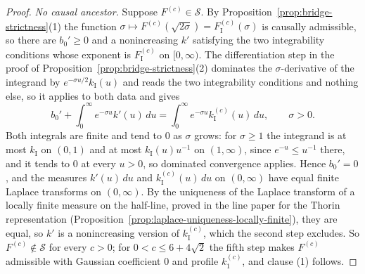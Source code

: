 \begin{proof}
\emph{No causal ancestor.} Suppose $F^{(c)} \in \mathcal{S}$. By
Proposition~\ref{prop:bridge-strictness}(1) the function
$\sigma \mapsto F^{(c)}(\sqrt{2\sigma}) = F^{(c)}_{\mathrm I}(\sigma)$ is causally admissible, so
there are $b_0' \ge 0$ and a nonincreasing $k'$ satisfying the two integrability conditions
whose exponent is $F^{(c)}_{\mathrm I}$ on $[0,\infty)$. The differentiation step in the proof of
Proposition~\ref{prop:bridge-strictness}(2) dominates the $\sigma$-derivative of the integrand
by $e^{-\sigma u/2}k_{\mathrm I}(u)$ and reads the two integrability conditions and nothing else,
so it applies to both data and gives
\[
  b_0' + \int_0^\infty e^{-\sigma u}k'(u)\,du
   = \int_0^\infty e^{-\sigma u}k^{(c)}_{\mathrm I}(u)\,du , \qquad \sigma > 0 .
\]
Both integrals are finite and tend to $0$ as $\sigma$ grows: for $\sigma \ge 1$ the integrand is
at most $k_{\mathrm I}$ on $(0,1)$ and at most $k_{\mathrm I}(u)u^{-1}$ on $(1,\infty)$, since
$e^{-u} \le u^{-1}$ there, and it tends to $0$ at every $u > 0$, so dominated convergence applies.
Hence $b_0' = 0$, and the measures $k'(u)\,du$ and $k^{(c)}_{\mathrm I}(u)\,du$ on $(0,\infty)$
have equal finite Laplace transforms on $(0,\infty)$. By the uniqueness of the Laplace transform
of a locally finite measure on the half-line, proved in the line paper for the Thorin
representation (Proposition~\ref{prop:laplace-uniqueness-locally-finite}), they are equal, so
$k'$ is a nonincreasing version of $k^{(c)}_{\mathrm I}$, which the second step excludes. So
$F^{(c)} \notin \mathcal{S}$ for every $c > 0$; for $0 < c \le 6+4\sqrt2$ the fifth step makes
$F^{(c)}$ admissible with Gaussian coefficient $0$ and profile $k^{(c)}_1$, and clause (1)
follows.


\end{proof}
